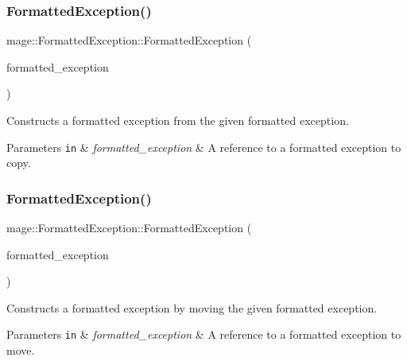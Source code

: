 \subsubsection{\texorpdfstring{Formatted\+Exception()}{FormattedException()}\hspace{0.1cm}{\footnotesize\ttfamily [4/5]}}
{\footnotesize\ttfamily mage\+::\+Formatted\+Exception\+::\+Formatted\+Exception (\begin{DoxyParamCaption}\item[{const \hyperlink{structmage_1_1_formatted_exception}{Formatted\+Exception} \&}]{formatted\+\_\+exception }\end{DoxyParamCaption})\hspace{0.3cm}{\ttfamily [default]}}

Constructs a formatted exception from the given formatted exception.


\begin{DoxyParams}[1]{Parameters}
\mbox{\tt in}  & {\em formatted\+\_\+exception} & A reference to a formatted exception to copy. \\
\hline
\end{DoxyParams}
\hypertarget{structmage_1_1_formatted_exception_ab1371b0a079fc50fcae39722e5e29cb2}{}\label{structmage_1_1_formatted_exception_ab1371b0a079fc50fcae39722e5e29cb2} 
\subsubsection{\texorpdfstring{Formatted\+Exception()}{FormattedException()}\hspace{0.1cm}{\footnotesize\ttfamily [5/5]}}
{\footnotesize\ttfamily mage\+::\+Formatted\+Exception\+::\+Formatted\+Exception (\begin{DoxyParamCaption}\item[{\hyperlink{structmage_1_1_formatted_exception}{Formatted\+Exception} \&\&}]{formatted\+\_\+exception }\end{DoxyParamCaption})\hspace{0.3cm}{\ttfamily [default]}}

Constructs a formatted exception by moving the given formatted exception.


\begin{DoxyParams}[1]{Parameters}
\mbox{\tt in}  & {\em formatted\+\_\+exception} & A reference to a formatted exception to move. \\
\hline
\end{DoxyParams}
\hypertarget{structmage_1_1_formatted_exception_a7bd56fe92b62d08b5ca4fb86592f1302}{}\label{structmage_1_1_formatted_exception_a7bd56fe92b62d08b5ca4fb86592f1302} 
